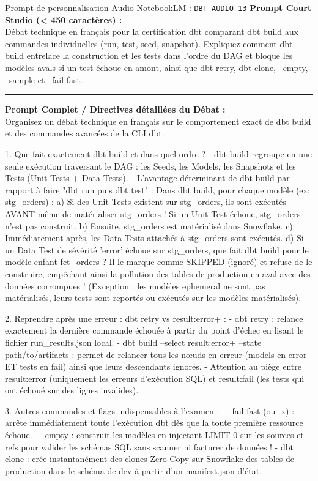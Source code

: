 \documentclass[11pt,a4paper]{article}
\begin{document}
\begin{promptbox}{Prompt de personnalisation Audio NotebookLM : \texttt{DBT-AUDIO-13}}
\textbf{Prompt Court Studio (< 450 caractères) :}\\
Débat technique en français pour la certification dbt comparant dbt build aux commandes individuelles (run, test, seed, snapshot). Expliquez comment dbt build entrelace la construction et les tests dans l'ordre du DAG et bloque les modèles avals si un test échoue en amont, ainsi que dbt retry, dbt clone, --empty, --sample et --fail-fast.

\medskip\hrule\medskip
\textbf{Prompt Complet / Directives détaillées du Débat :}\\
Organisez un débat technique en français sur le comportement exact de dbt build et des commandes avancées de la CLI dbt.

1. Que fait exactement dbt build et dans quel ordre ?
- dbt build regroupe en une seule exécution traversant le DAG : les Seeds, les Models, les Snapshots et les Tests (Unit Tests + Data Tests).
- L'avantage déterminant de dbt build par rapport à faire "dbt run puis dbt test" :
  Dans dbt build, pour chaque modèle (ex: stg\_orders) :
  a) Si des Unit Tests existent sur stg\_orders, ils sont exécutés AVANT même de matérialiser stg\_orders ! Si un Unit Test échoue, stg\_orders n'est pas construit.
  b) Ensuite, stg\_orders est matérialisé dans Snowflake.
  c) Immédiatement après, les Data Tests attachés à stg\_orders sont exécutés.
  d) Si un Data Test de sévérité 'error' échoue sur stg\_orders, que fait dbt build pour le modèle enfant fct\_orders ? Il le marque comme SKIPPED (ignoré) et refuse de le construire, empêchant ainsi la pollution des tables de production en aval avec des données corrompues !
  (Exception : les modèles ephemeral ne sont pas matérialisés, leurs tests sont reportés ou exécutés sur les modèles matérialisés).

2. Reprendre après une erreur : dbt retry vs result:error+ :
- dbt retry : relance exactement la dernière commande échouée à partir du point d'échec en lisant le fichier run\_results.json local.
- dbt build --select result:error+ --state path/to/artifacts : permet de relancer tous les nœuds en erreur (models en error ET tests en fail) ainsi que leurs descendants ignorés.
- Attention au piège entre result:error (uniquement les erreurs d'exécution SQL) et result:fail (les tests qui ont échoué sur des lignes invalides).

3. Autres commandes et flags indispensables à l'examen :
- --fail-fast (ou -x) : arrête immédiatement toute l'exécution dbt dès que la toute première ressource échoue.
- --empty : construit les modèles en injectant LIMIT 0 sur les sources et refs pour valider les schémas SQL sans scanner ni facturer de données !
- dbt clone : crée instantanément des clones Zero-Copy sur Snowflake des tables de production dans le schéma de dev à partir d'un manifest.json d'état.
\end{promptbox}
\end{document}
